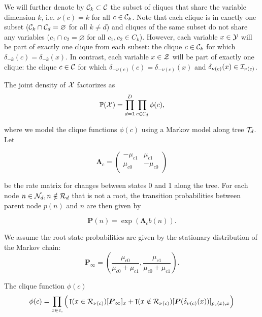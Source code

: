 \documentclass[
11pt, %
english, %
singlespacing, %
headsepline, %
chapterinoneline, %
]{MastersDoctoralThesis} %
\DeclareMathOperator{\Ind}{I}
\def\P{\mathbb{P}}
\def\bLambda{\boldsymbol{\Lambda}}
\def\bP{\boldsymbol{P}}
\def\Ccal{{\cal C}}
\def\I{{\cal I}}
\def\N{{\cal N}}
\def\R{{\cal R}}
\def\T{{\cal T}}
\def\X{{\cal X}}
\def\Y{{\cal Y}}
\def\Z{{\cal Z}}
\begin{document}
We will further denote by $\Ccal_k \subset \Ccal$ the subset of cliques that share the variable dimension $k$, i.e. $\nu(c)=k$ for all $c \in \Ccal_k$. Note that each clique is in exactly one subset ($\Ccal_k \cap \Ccal_d = \varnothing$ for all $k \neq d$) and cliques of the same subset do not share any variables ($c_1 \cap c_2 = \varnothing$ for all $c_1, c_2 \in C_k$). However, each variable $x \in \Y$ will be part of exactly one clique from each subset: the clique $c \in \Ccal_k$ for which $\delta_{-k}(c) = \delta_{-k}(x)$. In contrast, each variable $x \in \Z$ will be part of exactly one clique: the clique $c \in \Ccal$ for which $\delta_{-\nu(c)}(c) = \delta_{-\nu(c)}(x)$ and $\delta_{\nu(c)}(x) \in \I_{\nu(c)}$.

The joint density of $\X$ factorizes as
\begin{equation}
	\P(\X) = \prod_{d=1}^D \prod_{c \in \Ccal_d} \phi(c),
\end{equation}

where
we model the clique functions $\phi(c)$ using a Markov model along tree $\T_d$. Let

\begin{equation}
	\bLambda_c =
	\begin{pmatrix}
		-\mu_{c1} & \mu_{c1}\\
		\mu_{c0} & -\mu_{c0}\\
	\end{pmatrix}
\end{equation}

be the rate matrix for changes between states 0 and 1 along the tree. For each node $n \in \N_d, n \notin \R_d$ that is not a root, the transition probabilities between parent node $p(n)$ and $n$ are then given by

\begin{equation}
	\bP(n) = \exp(\bLambda_c b(n)).
\end{equation}

We assume the root state probabilities are given by the stationary distribution of the Markov chain:
\begin{equation}
	\bP_{\infty} = \left(\frac{\mu_{c0}}{\mu_{c0} + \mu_{c1}}, \frac{\mu_{c1}}{\mu_{c0} + \mu_{c1}}\right).
\end{equation}


The clique function $\phi(c)$
\begin{equation}
	\phi(c) = \prod_{x \in c, }\Big( \Ind(x \in \R_{\nu(c)})[\bP_{\infty}]_x + \Ind(x \notin \R_{\nu(c)}) [\bP(\delta_{\nu(c)}(x))]_{p_{c}(x), x} \Big)
\end{equation}
\end{document}
